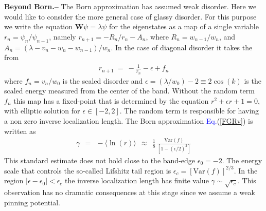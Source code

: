\documentclass[twocolumn,showpacs,aps,pre]{revtex4-1}
\newcommand{\be}[1]{\begin{eqnarray} \label{e#1}}
\newcommand{\eeq}{\end{eqnarray}}
\newcommand{\Eq}[1]{{\textcolor{blue}{Eq.}}(\ref{#1})}
\newcommand{\sect}[1]{{\bf #1.-- }}
\begin{document}
\sect{Beyond Born}
%
The Born approximation has assumed weak disorder. 
Here we would like to consider the more general case 
of glassy disorder. For this purpose we write 
the equation ${\bm{W}\psi = \lambda \psi}$ for the eigenstates 
as a map of a single variable ${r_n=\psi_{n}/\psi_{n-1}}$,   
namely  ${r_{n+1} = -R_n/r_n - A_n}$,  
where ${R_n=w_{n-1}/w_{n}}$, and ${A_n = (\lambda-v_n-w_n-w_{n-1})/w_n}$.
In the case of diagonal disorder it takes the from  
%
\be{8}
r_{n+1} \ = \ -\frac{1}{r_n} - \epsilon + f_n
\eeq
%
where $f_n=v_n/w_0$ is the scaled disorder 
and $\epsilon=(\lambda/w_0){-}2 \equiv 2\cos(k)$ 
is the scaled energy 
measured from the center of the band.
%
Without the random term $f_n$ this map has a fixed-point 
that is determined by the equation ${ r^2+\epsilon r +1=0 }$, 
with elliptic solution for ${\epsilon\in[-2,2]}$. 
The random term is responsible for having 
a non zero inverse localization length.
The Born approximation \Eq{FGRv} is written as  
%
\be{9}
\gamma \ \ = \ \ -\langle \ln(r) \rangle \ \ \approx \ \ \frac{1}{8} \, \frac{ \mbox{Var}(f)}{\left[1-(\epsilon/2)^2\right]}
\eeq
% 
This standard estimate does not hold close to the band-edge $\epsilon_0{=}{-}2$. 
The energy scale that controls the so-called Lifshitz tail region 
is $\epsilon_c = [\mbox{Var}(f)]^{2/3}$.
In the region $|\epsilon-\epsilon_0|<\epsilon_c$ the inverse localization 
length has finite value $\gamma \sim \sqrt{\epsilon_c}$.
This observation has no dramatic consequences at this stage 
since we assume a weak pinning potential. 
\end{document}

